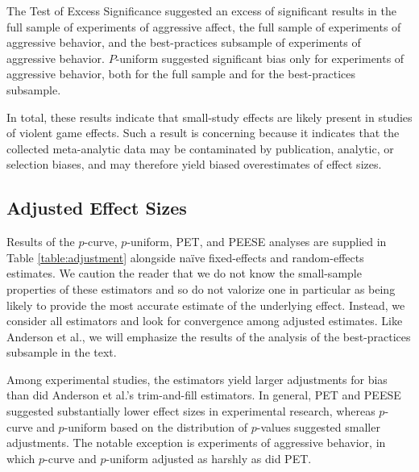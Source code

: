 \documentclass[man, mask]{apa6}
\begin{document}
The Test of Excess Significance suggested an excess of significant results in the full sample of experiments of aggressive affect, the full sample of experiments of aggressive behavior, and the best-practices subsample of experiments of aggressive behavior. $P$-uniform suggested significant bias only for experiments of aggressive behavior, both for the full sample and for the best-practices subsample.

In total, these results indicate that small-study effects are likely present in studies of violent game effects. Such a result is concerning because it indicates that the collected meta-analytic data may be contaminated by publication, analytic, or selection biases, and may therefore yield biased overestimates of effect sizes.

\subsection{Adjusted Effect Sizes}
Results of the $p$-curve, $p$-uniform, PET, and PEESE analyses are supplied in Table \ref{table:adjustment} alongside na{\"i}ve fixed-effects and random-effects estimates. We caution the reader that we do not know the small-sample properties of these estimators and so do not valorize one in particular as being likely to provide the most accurate estimate of the underlying effect. Instead, we consider all estimators and look for convergence among adjusted estimates. Like Anderson et al., we will emphasize the results of the analysis of the best-practices subsample in the text.

Among experimental studies, the estimators yield larger adjustments for bias than did Anderson et al.'s trim-and-fill estimators. In general, PET and PEESE suggested substantially lower effect sizes in experimental research, whereas $p$-curve and $p$-uniform based on the distribution of $p$-values suggested smaller adjustments. The notable exception is experiments of aggressive behavior, in which $p$-curve and $p$-uniform adjusted as harshly as did PET.
\end{document}

